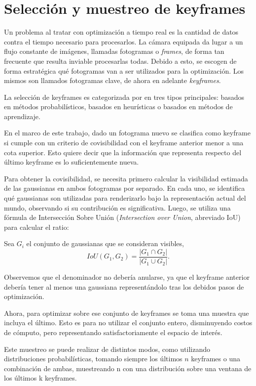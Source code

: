 \section{Selección y muestreo de keyframes}
Un problema al tratar con optimización a tiempo real es la cantidad de datos contra el tiempo necesario para procesarlos. La cámara equipada da lugar a un flujo constante de imágenes, llamadas fotogramas o \textit{frames}, de forma tan frecuente que resulta inviable procesarlas todas. Debido a esto, se escogen de forma estratégica qué fotogramas van a ser utilizados para la optimización. Los mismos son llamados fotogramas clave, de ahora en adelante \textit{keyframes}.

La selección de keyframes es categorizada por \cite{robotics12030088} en tres tipos principales: basados en métodos probabilísticos, basados en heurísticas o basados en métodos de aprendizaje.

En el marco de este trabajo, dado un fotograma nuevo se clasifica como keyframe si cumple con un criterio de covisibilidad con el keyframe anterior menor a una cota superior. Esto quiere decir que la información que representa respecto del último keyframe es lo suficientemente nueva.

Para obtener la covisibilidad, se necesita primero calcular la visibilidad estimada de las gaussianas en ambos fotogramas por separado. En cada uno, se identifica qué gaussianas son utilizadas para renderizarlo bajo la representación actual del mundo, observando si su contribución es significativa. Luego, se utiliza una fórmula de Intersección Sobre Unión (\textit{Intersection over Union}, abreviado IoU) para calcular el ratio:

Sea $G_i$ el conjunto de gaussianas que se consideran visibles,
$$
IoU (G_1, G_2) = \frac{|G_1 \cap G_2|}{|G_1 \cup G_2|}.
$$

Observemos que el denominador no debería anularse, ya que el keyframe anterior debería tener al menos una gaussiana representándolo tras los debidos pasos de optimización.



Ahora, para optimizar sobre ese conjunto de keyframes se toma una muestra que incluya el último. Esto es para no utilizar el conjunto entero, disminuyendo costos de cómputo, pero representando satisfactoriamente el espacio de interés.

Este muestreo se puede realizar de distintos modos, como utilizando distribuciones probabilísticas, tomando siempre los últimos $n$ keyframes o una combinación de ambas, muestreando n con una distribución sobre una ventana de los últimos k keyframes. 




